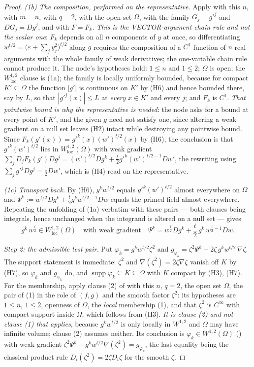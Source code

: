 \begin{proof}
\emph{(1b) The composition, performed on the representative.}  Apply
 with this $n$, with $m=n$, with $q=2$, with
the open set $\Omega$, with the family $G_j=g'^j$ and $DG_j=Dg^j$, and with
$F=F_k$.  \emph{This is the VECTOR-argument chain rule and not the scalar one}:
$F_k$ depends on all $n$ components of $y$ at once, so differentiating
$w^{t/2}=\bigl(\varepsilon+\sum_jy_j^2\bigr)^{t/2}$ along $g$ requires the
composition of a $C^1$ function of $n$ real arguments with the whole family of
weak derivatives; the one-variable chain rule cannot produce it.  The node's
hypotheses hold: $1\le n$ and $1\le2$; $\Omega$ is open; the
$W^{1,2}_{\mathrm{loc}}$ clause is (1a); the family is locally uniformly
bounded, because for compact $K'\subseteq\Omega$ the function $|g'|$ is
continuous on $K'$ by (H6) and hence bounded there, say by $L$, so that
$|g'^j(x)|\le L$ at \emph{every} $x\in K'$ and every $j$; and $F_k$ is $C^1$.
\emph{That pointwise bound is why the representative is needed}: the node asks
for a bound at every point of $K'$, and the given $g$ need not satisfy one,
since altering a weak gradient on a null set leaves (H2) intact while
destroying any pointwise bound.  Since $F_k(g'(x))=g'^k(x)(w')^{t/2}(x)$ by
(H6), the conclusion is that $g'^k(w')^{t/2}$ lies in
$W^{1,2}_{\mathrm{loc}}(\Omega)$ with weak gradient
$\sum_jD_jF_k(g')Dg^j=(w')^{t/2}Dg^k+\tfrac t2g'^k(w')^{t/2-1}Dw'$, the
rewriting using $\sum_jg'^jDg^j=\tfrac12Dw'$, which is (H4) read on the
representative.

\emph{(1c) Transport back.}  By (H6), $g^kw^{t/2}$ equals $g'^k(w')^{t/2}$
almost everywhere on $\Omega$ and
$\Psi^k:=w^{t/2}Dg^k+\tfrac t2g^kw^{t/2-1}Dw$ equals the primed field almost
everywhere.  Repeating the unfolding of (1a) verbatim with these pairs --- both
clauses being integrals, hence unchanged when the integrand is altered on a null
set --- gives
\[
g^k\,w^{\frac t2}\in W^{1,2}_{\mathrm{loc}}(\Omega)
\quad\text{with weak gradient}\quad
\Psi^k=w^{\frac t2}Dg^k+\frac t2\,g^k\,w^{\frac t2-1}Dw .
\tag{1}
\]

\emph{Step 2: the admissible test pair.}  Put
$\varphi_k=g^kw^{t/2}\zeta^2$ and
$g_{\varphi_k}=\zeta^2\Psi^k+2\zeta\,g^kw^{t/2}\,\nabla\zeta$.  The support
statement is immediate: $\zeta^2$ and $\nabla(\zeta^2)=2\zeta\nabla\zeta$ vanish
off $K$ by (H7), so $\varphi_k$ and $g_{\varphi_k}$ do, and
$\operatorname{supp}\varphi_k\subseteq K\subseteq\Omega$ with $K$ compact by
(H3), (H7).  For the membership, apply clause (2) of
 with this $n$, $q=2$, the open set $\Omega$, the
pair of (1) in the role of $(f,g)$ and the smooth factor $\zeta^2$: its
hypotheses are $1\le n$, $1\le2$, openness of $\Omega$, the \emph{local}
membership (1), and that $\zeta^2$ is $C^\infty$ with compact support inside
$\Omega$, which follows from (H3).  \emph{It is clause (2) and not clause (1)
that applies}, because $g^kw^{t/2}$ is only locally in $W^{1,2}$ and $\Omega$ may
have infinite volume; clause (2) assumes neither.  Its conclusion is
$\varphi_k\in W^{1,2}(\Omega)$ () with weak gradient
$\zeta^2\Psi^k+g^kw^{t/2}\nabla(\zeta^2)=g_{\varphi_k}$, the last equality being
the classical product rule $D_i(\zeta^2)=2\zeta D_i\zeta$ for the smooth
$\zeta$.


\end{proof}
